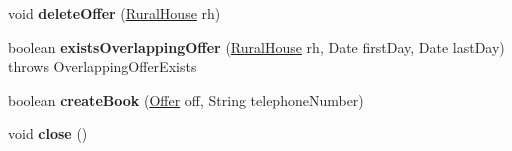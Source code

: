 \begin{DoxyCompactItemize}
void {\bfseries delete\+Offer} (\mbox{\hyperlink{classdomain_1_1_rural_house}{Rural\+House}} rh)
\item 
\mbox{\label{classdata_access_1_1_data_access_ab6b1332b8bb17a4f65457043247d0b5e}} 
boolean {\bfseries exists\+Overlapping\+Offer} (\mbox{\hyperlink{classdomain_1_1_rural_house}{Rural\+House}} rh, Date first\+Day, Date last\+Day)  throws Overlapping\+Offer\+Exists
\item 
\mbox{\label{classdata_access_1_1_data_access_a85fbdae5765eaacaadd42eb0e509aa9e}} 
boolean {\bfseries create\+Book} (\mbox{\hyperlink{classdomain_1_1_offer}{Offer}} off, String telephone\+Number)
\item 
\mbox{\label{classdata_access_1_1_data_access_a58d3d443d0a2f5d74b6240248a257fd5}} 
void {\bfseries close} ()
\end{DoxyCompactItemize}
